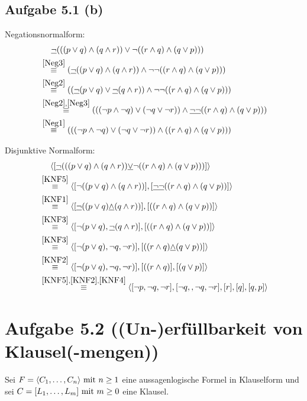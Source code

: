 \documentclass[12pt,a4paper]{article}
\begin{document}
\subsection*{Aufgabe 5.1 (b)}
Negationsnormalform:
\begin{align*}
&~~~~\underline{\neg}(((p\vee q)\wedge(q\wedge r))\vee\neg((r\wedge q)\wedge(q\vee p)))\\
&\stackrel{\ref{Neg3}}{\equiv}
(\underline{\neg}((p\vee q)\wedge(q\wedge r))\wedge\neg\neg((r\wedge q)\wedge(q\vee p)))\\
&\stackrel{\ref{Neg2}}{\equiv}
((\underline{\neg}(p\vee q)\vee\underline{\neg}(q\wedge r))\wedge\neg\neg((r\wedge q)\wedge(q\vee p)))\\
&\stackrel{\ref{Neg2},\ref{Neg3}}{\equiv}
(((\neg p\wedge\neg q)\vee(\neg q\vee\neg r))\wedge\underline{\neg\neg}((r\wedge q)\wedge(q\vee p)))\\
&\stackrel{\ref{Neg1}}{\equiv}
(((\neg p\wedge\neg q)\vee(\neg q\vee\neg r))\wedge((r\wedge q)\wedge(q\vee p)))
\end{align*}

Disjunktive Normalform:
\begin{align*}
&~~~~\langle[\underline{\neg}(((p\vee q)\wedge(q\wedge r))\underline{\vee}\neg((r\wedge q)\wedge(q\vee p)))]\rangle\\
&\stackrel{\ref{KNF5}}{\equiv}
\langle[\neg((p\vee q)\wedge(q\wedge r))],[\underline{\neg\neg}((r\wedge q)\wedge(q\vee p))]\rangle\\
&\stackrel{\ref{KNF1}}{\equiv}
\langle[\underline{\neg}((p\vee q)\underline{\wedge}(q\wedge r))],[((r\wedge q)\wedge(q\vee p))]\rangle\\
&\stackrel{\ref{KNF3}}{\equiv}
\langle[\neg(p\vee q),\underline{\neg}(q\wedge r)],[((r\wedge q)\wedge(q\vee p))]\rangle\\
&\stackrel{\ref{KNF3}}{\equiv}
\langle[\neg(p\vee q),\neg q, \neg r)],[((r\wedge q)\underline{\wedge}(q\vee p))]\rangle\\
&\stackrel{\ref{KNF2}}{\equiv}
\langle[\neg(p\vee q),\neg q, \neg r)],[((r\wedge q)],[(q\vee p)]\rangle\\
&\stackrel{\ref{KNF5},\ref{KNF2},\ref{KNF4}}{\equiv}
\langle[\neg p,\neg q,\neg r],[\neg q,,\neg q, \neg r],[r],[q],[q,p]\rangle\\
\end{align*}

\section*{Aufgabe 5.2 ((Un-)erfüllbarkeit von Klausel(-mengen))}
Sei $F=\langle C_1,\ldots,C_n\rangle\mit n\geq1$ eine aussagenlogische Formel in Klauselform und sei $C=[L_1,\ldots,L_m]\mit m\geq0$ eine Klausel.
\end{document}
